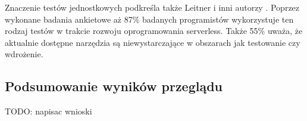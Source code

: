 Znaczenie testów jednostkowych podkreśla także Leitner i inni autorzy \cite{LEITNER2019340}.
Poprzez wykonane badania ankietowe aż 87\% badanych programistów wykorzystuje ten rodzaj testów w trakcie rozwoju oprogramowania serverless.
Także 55\% uważa, że aktualnie dostępne narzędzia są niewystarczające w obszarach jak testowanie czy wdrożenie.

\subsection{Podsumowanie wyników przeglądu}\label{chapter:przeglad_literatury_wyniki_podsumowanie}

TODO: napisac wnioski
